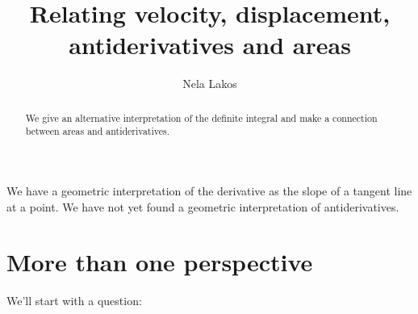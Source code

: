 \documentclass{ximera}
\author{Nela Lakos}
\title[Dig-In:]{Relating velocity, displacement, antiderivatives and areas}
\begin{document}
\begin{abstract}
We give an alternative interpretation of the definite integral and
make a connection between areas and antiderivatives.
\end{abstract}
\maketitle

We have a geometric interpretation of the derivative as the slope of a
tangent line at a point.  We have not yet found a geometric
interpretation of antiderivatives.


\section{More than one perspective}

We'll start with a question:
\end{document}
